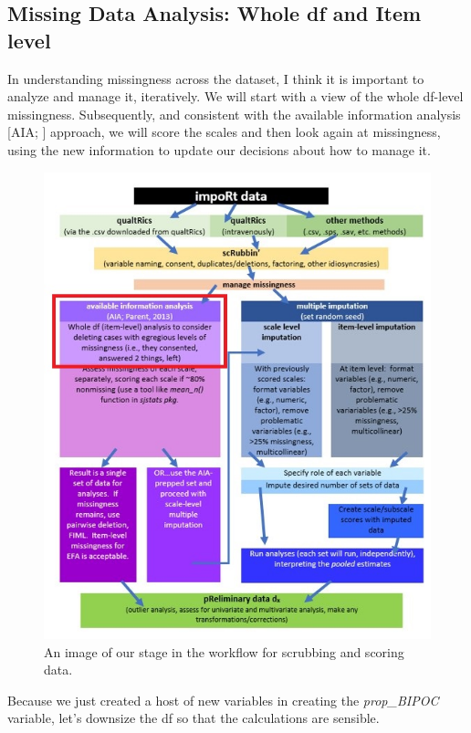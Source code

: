 \documentclass[
  english,
]{book}
\begin{document}
\hypertarget{missing-data-analysis-whole-df-and-item-level}{%
\subsection{Missing Data Analysis: Whole df and Item level}\label{missing-data-analysis-whole-df-and-item-level}}

In understanding missingness across the dataset, I think it is important to analyze and manage it, iteratively. We will start with a view of the whole df-level missingness. Subsequently, and consistent with the available information analysis {[}AIA; \citet{parent_handling_2013}{]} approach, we will score the scales and then look again at missingness, using the new information to update our decisions about how to manage it.

\begin{figure}
\centering
\includegraphics{images/Ch02/wrkflow_item_lvl.jpg}
\caption{An image of our stage in the workflow for scrubbing and scoring data.}
\end{figure}

Because we just created a host of new variables in creating the \emph{prop\_BIPOC} variable, let's downsize the df so that the calculations are sensible.
\end{document}

